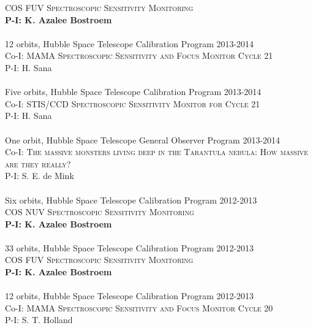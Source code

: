 \documentclass[10pt]{cv}
\begin{document}
\begin{llist}
\textsc{COS FUV Spectroscopic Sensitivity Monitoring}\\
{\bf P-I: K. Azalee Bostroem} \\ %
\\
12 orbits, Hubble Space Telescope Calibration Program \hfill  2013-2014\\ %
Co-I: \textsc{MAMA Spectroscopic Sensitivity and Focus Monitor Cycle 21}\\ 
P-I: H. Sana \\ %
\\
Five orbits, Hubble Space Telescope Calibration Program \hfill  2013-2014\\ %
Co-I: \textsc{STIS/CCD Spectroscopic Sensitivity Monitor for Cycle 21} \\
P-I: H. Sana\\ %
\\
One orbit, Hubble Space Telescope General Observer Program \hfill  2013-2014\\ %
Co-I: \textsc{The massive monsters living deep in the Tarantula nebula: How massive are they really?} \\
P-I: S. E. de Mink\\ %
\\
Six orbits, Hubble Space Telescope Calibration Program \hfill 2012-2013\\ %
\textsc{COS NUV Spectroscopic Sensitivity Monitoring}\\
{\bf P-I: K. Azalee Bostroem} \\ %
\\
33 orbits, Hubble Space Telescope Calibration Program \hfill 2012-2013\\ %
\textsc{COS FUV Spectroscopic Sensitivity Monitoring}\\
{\bf P-I: K. Azalee Bostroem} \\ %
\\
12 orbits, Hubble Space Telescope Calibration Program \hfill  2012-2013\\ %
Co-I: \textsc{MAMA Spectroscopic Sensitivity and Focus Monitor Cycle 20}\\
P-I: S. T. Holland\\ %
\\

\end{llist}
\end{document}
